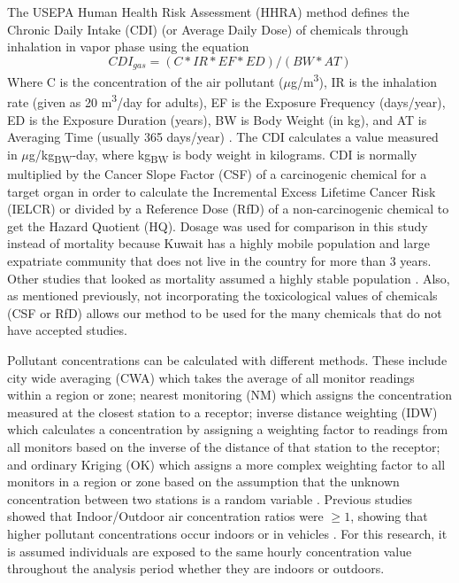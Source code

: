 The USEPA Human Health Risk Assessment (HHRA) method defines the Chronic Daily Intake (CDI) (or Average Daily Dose) of chemicals through inhalation in vapor phase using the equation
%
\begin{equation}
\label{eq:CDI-gas}
CDI_{gas} = (C*IR*EF*ED) / (BW*AT)
\end{equation}
%
Where C is the concentration of the air pollutant ($\mu$g/m\textsuperscript{3}), IR is the inhalation rate (given as 20 m\textsuperscript{3}/day for adults), EF is the Exposure Frequency (days/year), ED is the Exposure Duration (years), BW is Body Weight (in kg), and AT is Averaging Time (usually 365 days/year) \cite{USEPA2005}.  The CDI calculates a value measured in $\mu$g/kg\textsubscript{BW}-day, where kg\textsubscript{BW} is body weight in kilograms. CDI is normally multiplied by the Cancer Slope Factor (CSF) of a carcinogenic chemical for a target organ in order to calculate the Incremental Excess Lifetime Cancer Risk (IELCR) or divided by a Reference Dose (RfD) of a non-carcinogenic chemical to get the Hazard Quotient (HQ). Dosage was used for comparison in this study instead of mortality because Kuwait has a highly mobile population and large expatriate community that does not live in the country for more than 3 years. Other studies that looked as mortality assumed a highly stable population \cite{Sanhueza2010}. Also, as mentioned previously, not incorporating the toxicological values of chemicals (CSF or RfD) allows our method to be used for the many chemicals that do not have accepted studies.

Pollutant concentrations can be calculated with different methods. These include city wide averaging (CWA) which takes the average of all monitor readings within a region or zone; nearest monitoring (NM) which assigns the concentration measured at the closest station to a receptor; inverse distance weighting (IDW) which calculates a concentration by assigning a weighting factor to readings from all monitors based on the inverse of the distance of that station to the receptor; and ordinary Kriging (OK) which assigns a more complex weighting factor to all monitors in a region or zone based on the assumption that the unknown concentration between two stations is a random variable \cite{Rivera-Gonzalez2015}. Previous studies showed that Indoor/Outdoor air concentration ratios were $\geq1$, showing that higher pollutant concentrations occur indoors \citep{Schembari2013} or in vehicles \citep{Abi-Esber2013}. For this research, it is assumed individuals are exposed to the same hourly concentration value throughout the analysis period whether they are indoors or outdoors.

